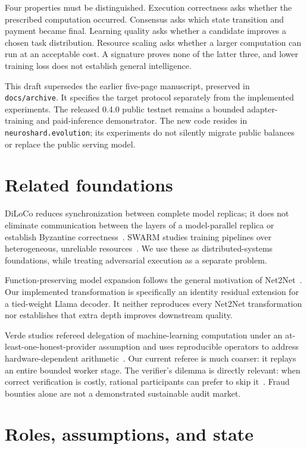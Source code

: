 \documentclass[11pt]{article}
\begin{document}
Four properties must be distinguished. Execution correctness asks whether the prescribed computation occurred. Consensus asks which state transition and payment became final. Learning quality asks whether a candidate improves a chosen task distribution. Resource scaling asks whether a larger computation can run at an acceptable cost. A signature proves none of the latter three, and lower training loss does not establish general intelligence.

This draft supersedes the earlier five-page manuscript, preserved in \texttt{docs/archive}. It specifies the target protocol separately from the implemented experiments. The released 0.4.0 public testnet remains a bounded adapter-training and paid-inference demonstrator. The new code resides in \texttt{neuroshard.evolution}; its experiments do not silently migrate public balances or replace the public serving model.

\section{Related foundations}
DiLoCo reduces synchronization between complete model replicas; it does not eliminate communication between the layers of a model-parallel replica or establish Byzantine correctness~\cite{diloco}. SWARM studies training pipelines over heterogeneous, unreliable resources~\cite{swarm}. We use these as distributed-systems foundations, while treating adversarial execution as a separate problem.

Function-preserving model expansion follows the general motivation of Net2Net~\cite{net2net}. Our implemented transformation is specifically an identity residual extension for a tied-weight Llama decoder. It neither reproduces every Net2Net transformation nor establishes that extra depth improves downstream quality.

Verde studies refereed delegation of machine-learning computation under an at-least-one-honest-provider assumption and uses reproducible operators to address hardware-dependent arithmetic~\cite{verde}. Our current referee is much coarser: it replays an entire bounded worker stage. The verifier's dilemma is directly relevant: when correct verification is costly, rational participants can prefer to skip it~\cite{dilemma}. Fraud bounties alone are not a demonstrated sustainable audit market.

\section{Roles, assumptions, and state}
\end{document}
